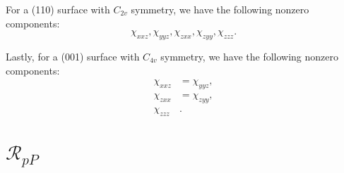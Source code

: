 For a (110) surface with $C_{2v}$ symmetry, we have the following nonzero
components: 
\begin{equation}\label{eqapp:nonzero110}
\chi_{xxz}, \chi_{yyz}, \chi_{zxx}, \chi_{zyy}, \chi_{zzz}.
\end{equation}

Lastly, for a (001) surface with $C_{4v}$ symmetry, we have the following
nonzero components:
\begin{equation}\label{eqapp:nonzero001}
\begin{split}
\chi_{xxz}&=\chi_{yyz},\\
\chi_{zxx}&=\chi_{zyy},\\
\chi_{zzz}&.
\end{split}
\end{equation}



\section{\texorpdfstring{$\mathcal{R}_{pP}$}{RpP}}

